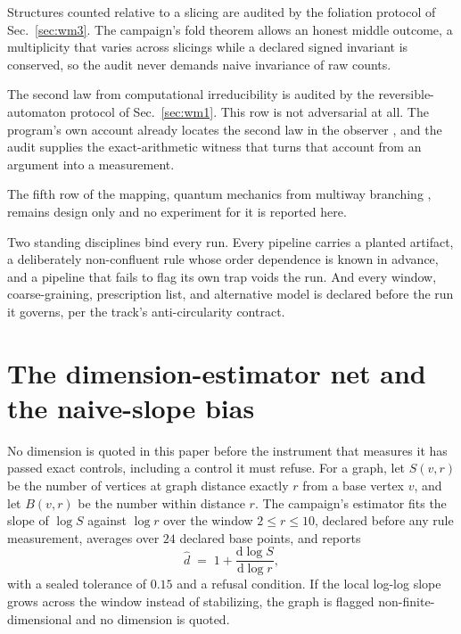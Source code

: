 \documentclass[aps,pre,reprint,nofootinbib]{revtex4-2}
\newcommand{\dd}{\mathrm{d}}
\begin{document}
Structures counted relative to a slicing are audited by the
foliation protocol of Sec.~\ref{sec:wm3}.  The campaign's fold theorem
allows an honest middle outcome, a multiplicity that varies across
slicings while a declared signed invariant is conserved, so the audit
never demands naive invariance of raw counts.

The second law from computational irreducibility is audited by the
reversible-automaton protocol of Sec.~\ref{sec:wm1}.  This row is not
adversarial at all.  The program's own account already locates the
second law in the observer \cite{Wolfram2023}, and the audit supplies
the exact-arithmetic witness that turns that account from an argument
into a measurement.

The fifth row of the mapping, quantum mechanics from multiway
branching \cite{Gorard2020b}, remains design only and no experiment
for it is reported here.

Two standing disciplines bind every run.  Every pipeline carries a
planted artifact, a deliberately non-confluent rule whose order
dependence is known in advance, and a pipeline that fails to flag its
own trap voids the run.  And every window, coarse-graining,
prescription list, and alternative model is declared before the run it
governs, per the track's anti-circularity contract.

\section{The dimension-estimator net and the naive-slope bias}
\label{sec:wm0}

No dimension is quoted in this paper before the instrument that
measures it has passed exact controls, including a control it must
refuse.  For a graph, let $S(v,r)$ be the number of vertices at graph
distance exactly $r$ from a base vertex $v$, and let $B(v,r)$ be the
number within distance $r$.  The campaign's estimator fits the slope
of $\log S$ against $\log r$ over the window $2 \le r \le 10$,
declared before any rule measurement, averages over $24$ declared base
points, and reports
\begin{equation}
  \hat d \;=\; 1 + \frac{\dd \log S}{\dd \log r},
  \label{eq:dhat}
\end{equation}
with a sealed tolerance of $0.15$ and a refusal condition.  If the
local log-log slope grows across the window instead of stabilizing,
the graph is flagged non-finite-dimensional and no dimension is
quoted.
\end{document}
